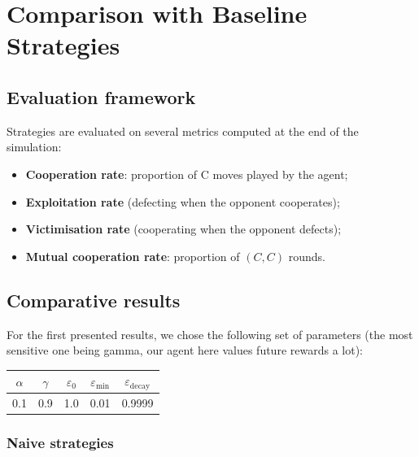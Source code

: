 \documentclass[11pt, a4paper]{article}
\begin{document}
\section{Comparison with Baseline Strategies}
\label{sec:baselines}

\subsection{Evaluation framework}


Strategies are evaluated on several metrics computed at the end of the simulation:
\begin{itemize}
  \item \textbf{Cooperation rate}: proportion of C moves played by the agent;
  \item \textbf{Exploitation rate} (defecting when the opponent cooperates);
  \item \textbf{Victimisation rate} (cooperating when the opponent defects);
  \item \textbf{Mutual cooperation rate}: proportion of $(C, C)$ rounds.
\end{itemize}

\subsection{Comparative results}

For the first presented results, we chose the following set of parameters (the most sensitive one being gamma, our agent here values future rewards a lot):
\begin{center}
  \begin{tabular}{ccccc}
    \toprule
    $\alpha$ & $\gamma$ & $\varepsilon_0$ & $\varepsilon_{\min}$ & $\varepsilon_{\text{decay}}$ \\
    \midrule
    0.1 & 0.9 & 1.0 & 0.01 & 0.9999 \\
    \bottomrule
  \end{tabular}
\end{center}

\subsubsection{Naive strategies}
\end{document}

